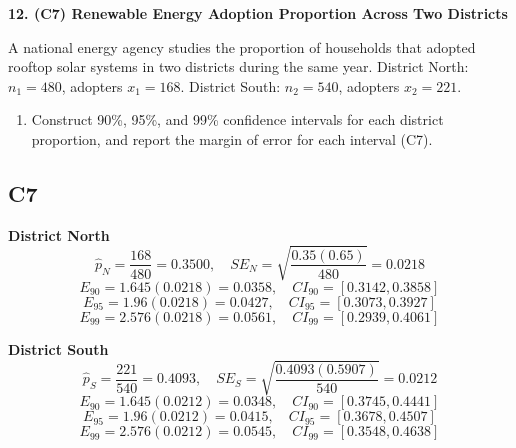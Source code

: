 \begin{ExamProblems}
		\newpage
		\item
		\textbf{12. (C7) Renewable Energy Adoption Proportion Across Two Districts}
		
		A national energy agency studies the proportion of households that adopted rooftop solar systems in two districts during the same year.
		District North: $n_1=480$, adopters $x_1=168$.
		District South: $n_2=540$, adopters $x_2=221$.
		\begin{enumerate}
			\item Construct 90\%, 95\%, and 99\% confidence intervals for each district proportion, and report the margin of error for each interval (C7).
		\end{enumerate}
		
		\subsection*{C7}
		\textbf{District North}
		\[
		\hat{p}_N=\frac{168}{480}=0.3500,
		\quad SE_N=\sqrt{\frac{0.35(0.65)}{480}}=0.0218
		\]
		\[
		E_{90}=1.645(0.0218)=0.0358,\quad CI_{90}=[0.3142,0.3858]
		\]
		\[
		E_{95}=1.96(0.0218)=0.0427,\quad CI_{95}=[0.3073,0.3927]
		\]
		\[
		E_{99}=2.576(0.0218)=0.0561,\quad CI_{99}=[0.2939,0.4061]
		\]
		
		\textbf{District South}
		\[
		\hat{p}_S=\frac{221}{540}=0.4093,
		\quad SE_S=\sqrt{\frac{0.4093(0.5907)}{540}}=0.0212
		\]
		\[
		E_{90}=1.645(0.0212)=0.0348,\quad CI_{90}=[0.3745,0.4441]
		\]
		\[
		E_{95}=1.96(0.0212)=0.0415,\quad CI_{95}=[0.3678,0.4507]
		\]
		\[
		E_{99}=2.576(0.0212)=0.0545,\quad CI_{99}=[0.3548,0.4638]
		\]
		
	\end{ExamProblems}
	

